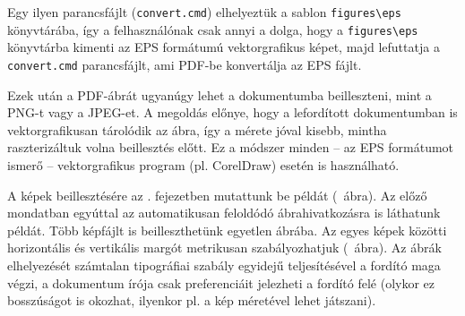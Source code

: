 Egy ilyen parancsfájlt (\verb+convert.cmd+) elhelyeztük a sablon \verb+figures\eps+ könyvtárába, így a felhasználónak csak annyi a dolga, hogy a \verb+figures\eps+ könyvtárba kimenti az EPS formátumú vektorgrafikus képet, majd lefuttatja a \verb+convert.cmd+ parancsfájlt, ami PDF-be konvertálja az EPS fájlt.

Ezek után a PDF-ábrát ugyanúgy lehet a dokumentumba beilleszteni, mint a PNG-t vagy a JPEG-et. A megoldás előnye, hogy a lefordított dokumentumban is vektorgrafikusan tárolódik az ábra, így a mérete jóval kisebb, mintha raszterizáltuk volna beillesztés előtt. Ez a módszer minden -- az EPS formátumot ismerő -- vektorgrafikus program (pl. CorelDraw) esetén is használható.

A képek beillesztésére az . fejezetben mutattunk be példát (~ábra). Az előző mondatban egyúttal az automatikusan feloldódó ábrahivatkozásra is láthatunk példát. Több képfájlt is beilleszthetünk egyetlen ábrába. Az egyes képek közötti horizontális és vertikális margót metrikusan szabályozhatjuk (~ábra). Az ábrák elhelyezését számtalan tipográfiai szabály egyidejű teljesítésével a fordító maga végzi, a dokumentum írója csak preferenciáit jelezheti a fordító felé (olykor ez bosszúságot is okozhat, ilyenkor pl. a kép méretével lehet játszani).

